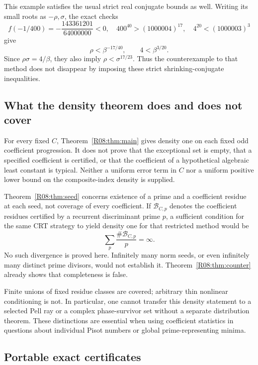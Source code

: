 \documentclass[11pt,a4paper]{article}
\theoremstyle{definition}\newtheorem{definition}[theorem]{Definition}
\theoremstyle{remark}\newtheorem{remark}[theorem]{Remark}
\begin{document}
This example satisfies the usual strict real conjugate bounds as well.
Writing its small roots as $-\rho,\sigma$, the exact checks
\[
 f(-1/400)=-\frac{143361201}{64000000}<0,\quad
 400^{40}>(1000004)^{17},\quad 4^{20}<(1000003)^3
\]
give
\[
                \rho<\beta^{-17/40},\qquad 4<\beta^{3/20}.
\]
Since $\rho\sigma=4/\beta$, they also imply
$\rho<\sigma^{17/23}$.
Thus the counterexample to that method does not disappear by imposing
these strict shrinking-conjugate inequalities.

\subsection{What the density theorem does and does not cover}

For every fixed $C$, Theorem~\ref{R08:thm:main} gives density one on each
fixed odd coefficient progression. It does not prove that the exceptional
set is empty, that a specified coefficient is certified, or that the
coefficient of a hypothetical algebraic least constant is typical.
Neither a uniform error term in $C$ nor a uniform positive lower bound
on the composite-index density is supplied.

Theorem~\ref{R08:thm:seed} concerns existence of a prime and a coefficient
residue at each seed, not coverage of every coefficient.
If $\mathcal B_{C,p}$ denotes the coefficient residues certified by a
recurrent discriminant prime $p$, a sufficient condition for the same
CRT strategy to yield density one for that restricted method would be
\[
                          \sum_p\frac{\#\mathcal B_{C,p}}p=\infty.
\]
No such divergence is proved here. Infinitely many norm seeds, or even
infinitely many distinct prime divisors, would not establish it.
Theorem~\ref{R08:thm:counter} already shows that completeness is false.

Finite unions of fixed residue classes are covered; arbitrary thin
nonlinear conditioning is not. In particular, one cannot transfer this
density statement to a selected Pell ray or a complex phase-survivor set
without a separate distribution theorem. These distinctions are essential
when using coefficient statistics in questions about individual Pisot
numbers or global prime-representing minima.


\subsection{Portable exact certificates}\label{R08:app:certs}
\end{document}
